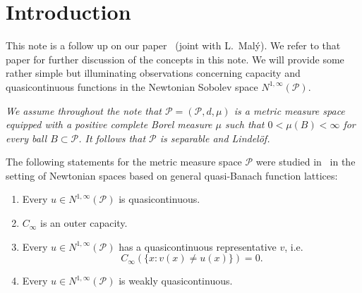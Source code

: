 \documentclass[a4paper,twoside]{article}
\theoremstyle{propositional}
\theoremstyle{descriptive}
\newcommand{\Cinfty}{{C_\infty}}
\newcommand{\Ninfty}{N^{1,\infty}}
\newcommand{\NinftyP}{N^{1,\infty}(\P)}
\renewcommand{\P}{\mathcal{P}}
\numberwithin{equation}{section}
\begin{document}


\medskip



\section{Introduction}

This note is a follow up on our paper~\cite{BBLMaly} (joint with L.~Mal\'y).
We refer to that paper for further discussion of the concepts in this note.
We will provide some
rather simple but illuminating observations
concerning capacity and quasicontinuous functions in the Newtonian Sobolev space $\Ninfty(\P)$.


\medskip

\emph{We assume throughout the note that $\P = (\P, d, \mu)$
is a metric measure space equipped with a
positive complete Borel measure 
$\mu$ such that $0 < \mu(B) < \infty$ for every ball $B \subset \P$.
It follows that $\P$ is separable and Lindel\"of.}

\medskip



The  following statements
for the metric measure space $\P$ were studied in~\cite{BBLMaly}
in the setting of Newtonian spaces based on general 
quasi-Banach function lattices\/\textup{:}


\begin{enumerate}
\renewcommand{\theenumi}{\textup{(\Alph{enumi})}}%
\item \label{b-qcont}
Every $u \in \Ninfty(\P)$ is quasicontinuous.
\item \label{b-outer}
$\Cinfty$ is an outer capacity.
\item \label{b-repr}
Every $u \in \NinftyP$ has a quasicontinuous representative $v$, i.e.\
\[
\Cinfty(\{x: v(x)\ne u(x)\})=0.
\]
\item \label{b-wqcont}
Every $u \in \NinftyP$ is weakly quasicontinuous.
\end{enumerate}
\end{document}
